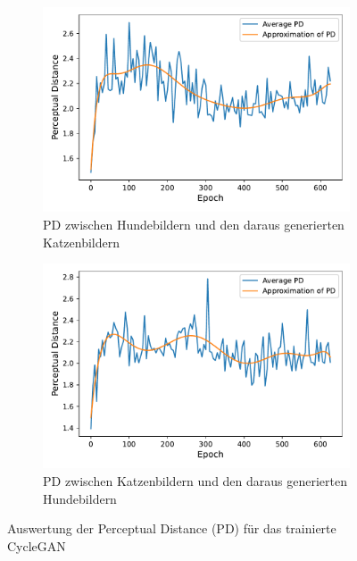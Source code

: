   \begin{figure}[ht]
 	\centering
 	\begin{subfigure}{\textwidth}
 		\centering
 		\includegraphics[width=.8\linewidth]{images/plot_line_plot_fidsdogcat}  
 		\caption{PD zwischen Hundebildern und den daraus generierten Katzenbildern}
 		\label{fig:sub-dogtocatpd}
 	\end{subfigure}
 	\newline
 	\begin{subfigure}{\textwidth}
 		\centering
 		\includegraphics[width=.8\linewidth]{images/plot_line_plot_fidscatdog}  
 		\caption{PD zwischen Katzenbildern und den daraus generierten Hundebildern}
 		\label{fig:sub-cattodogpd}
 	\end{subfigure}
 	\caption{Auswertung der Perceptual Distance (PD) für das trainierte CycleGAN}
 	\label{fig:fig}
 \end{figure}